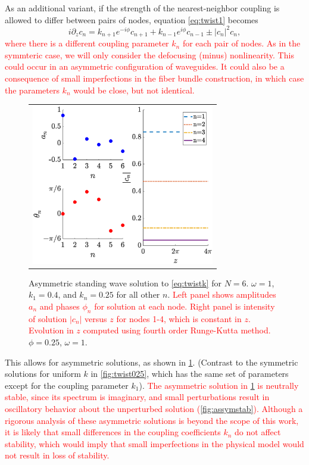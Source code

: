 \documentclass[reprint, amsmath,amssymb,aps,pra]{revtex4-2}
\def\noi{\noindent}
\renewcommand{\revised}[1]{ \textcolor{red}{#1} }
\begin{document}
As an additional variant, if the strength of the nearest-neighbor coupling is allowed to differ between pairs of nodes, equation \cref{eq:twist1} becomes
\begin{equation}\label{eq:twistk}
i \partial_z c_n = k_{n+1} e^{-i\phi}c_{n+1} + k_{n-1} e^{i\phi}c_{n-1} \pm |c_n|^2 c_n,
\end{equation}
\revised{where there is a different coupling parameter $k_n$ for each pair of nodes. As in the symmteric case, we will  only consider the defocusing (minus) nonlinearity. This could occur in an asymmetric configuration of waveguides. It could also be a consequence of small imperfections in the fiber bundle construction, in which case the parameters $k_n$ would be close, but not identical.}
\begin{figure}
\begin{center}
\begin{tabular}{c}
\includegraphics[width=8cm]{even6assym.eps}
\end{tabular}
\end{center}
\caption{Asymmetric standing wave solution to \cref{eq:twistk} for $N = 6$. $\omega = 1$, $k_1 = 0.4$, and $k_n = 0.25$ for all other $n$. \revised{Left panel shows amplitudes $a_n$ and phases $\phi_n$ for solution at each node. Right panel is intensity of solution $|c_n|$ versus $z$ for nodes 1-4, which is constant in $z$. Evolution in $z$ computed using fourth order Runge-Kutta method.} $\phi = 0.25$, $\omega = 1$.}
\label{fig:even6assym}
\end{figure}
\noi This allows for asymmetric solutions, as shown in \cref{fig:even6assym}. (Contrast to the symmetric solutions for uniform $k$ in \cref{fig:twist025}, which has the same set of parameters except for the coupling parameter $k_1$). \revised{The asymmetric solution in \cref{fig:even6assym} is neutrally stable, since its spectrum is imaginary, and small perturbations result in oscillatory behavior about the unperturbed solution (\cref{fig:assymstab}). Although a rigorous analysis of these asymmetric solutions is beyond the scope of this work, it is likely that small differences in the coupling coefficients $k_n$ do not affect stability, which would imply that small imperfections in the physical model would not result in loss of stability.}
\end{document}
